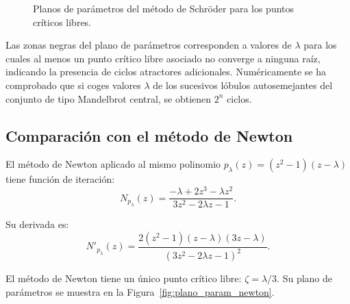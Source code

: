 \begin{figure}[H]
\begin{minipage}[t]{0.48\textwidth}
\end{minipage}
\caption{Planos de parámetros del método de Schröder para los puntos críticos libres.}
\label{fig:planos_param_sch}
\end{figure}


Las zonas negras del plano de parámetros corresponden a valores de $\lambda$ para los cuales al menos un punto crítico libre asociado no converge a ninguna raíz, indicando la presencia de ciclos atractores adicionales.
Numéricamente se ha comprobado que si coges valores $\lambda$ de los sucesivos lóbulos autosemejantes del conjunto de tipo Mandelbrot central, se obtienen $2^n$ ciclos.


\subsection{Comparación con el método de Newton}

El método de Newton aplicado al mismo polinomio $p_\lambda(z)=(z^2-1)(z-\lambda)$ tiene función de iteración:
$$
N_{p_\lambda}(z)=\frac{-\lambda+2z^3-\lambda z^2}{3z^2-2\lambda z-1}.
$$

Su derivada es:
$$
N'_{p_\lambda}(z)=\frac{2(z^2-1)(z-\lambda)(3z-\lambda)}{(3z^2-2\lambda z-1)^2}.
$$

El método de Newton tiene un único punto crítico libre: $\zeta=\lambda/3$. Su plano de parámetros se muestra en la Figura~\ref{fig:plano_param_newton}.

